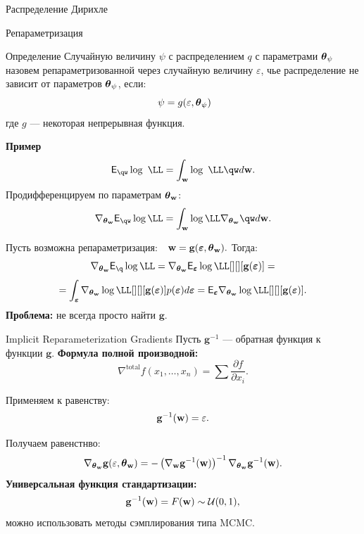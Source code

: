 \documentclass[10pt,pdf,utf8,russian,aspectratio=169]{beamer}
\begin{document}
\begin{frame}{Распределение Дирихле}
\begin{figure}
\end{figure}

\end{frame}




\begin{frame}{Репараметризация}
\footnotesize
\begin{block}{Определение} Случайную величину  $\psi$ с распределением $q$ с параметрами $\boldsymbol{\theta}_\psi$ назовем репараметризованной через случайную величину $\varepsilon$, чье распределение не зависит от параметров $\boldsymbol{\theta}_\psi$, если:
\[
   \psi = g(\varepsilon, \teta_\psi)
\]
где  $g$ --- некоторая непрерывная функция.
\end{block}

\textbf{Пример}
\[
    \E_{\qw} \log~\LL=  \int_{\w} \log~\LL \qw d\w.
\]
Продифференцируем по параметрам $\boldsymbol{\theta}_\mathbf{w}$:
\[
 \nabla_{\tetaw} \E_{\qw} \log \LL = 
\int_{\w}  \log \LL \nabla_{\tetaw}\qw d\w.
\]

Пусть возможна репараметризация:
$
    \w = \mathbf{g}(\boldsymbol{\varepsilon}, \tetaw).
$ 
Тогда:
\[
 \nabla_{\tetaw} \E_{\q} \log \LL = \nabla_{\tetaw} \E_{\boldsymbol{\varepsilon}} \log \LL [][][\mathbf{g}(\boldsymbol{\varepsilon})] =
\]
\[= \int_{\boldsymbol{\varepsilon}}\nabla_{\tetaw} \log\LL [][][\mathbf{g}(\boldsymbol{\varepsilon})] p(\boldsymbol{\varepsilon}) d\boldsymbol{\varepsilon}=\E_{\boldsymbol{\varepsilon}} \nabla_{\tetaw} \log\LL [][][\mathbf{g}(\boldsymbol{\varepsilon})].\]
\textbf{Проблема:} не всегда просто найти $\mathbf{g}$.
\end{frame}


\begin{frame}{Implicit Reparameterization Gradients}
Пусть $\mathbf{g}^{-1}$ --- обратная функция к функции $\mathbf{g}$.
\textbf{Формула полной производной:}
\[
    \nabla^{\text{total}} f(x_1,\dots,x_n) = \sum \frac{\partial{f}}{\partial{x_i}}.
\]

Применяем к равенству:
\[
    \mathbf{g}^{-1}(\mathbf{w}) = \varepsilon.
\]

Получаем равенстнво:
\[
    \nabla_{\boldsymbol{\theta}_\mathbf{w}} \mathbf{g}(\varepsilon, \boldsymbol{\theta}_\mathbf{w}) = -\left(\nabla_{\mathbf{w}} \mathbf{g}^{-1}(\mathbf{w}) \right)^{-1} \nabla_{\boldsymbol{\theta}_\mathbf{w}} \mathbf{g}^{-1}(\mathbf{w}).
\]
\textbf{Универсальная функция стандартизации:}
\[
    \mathbf{g}^{-1}(\mathbf{w}) = F(\mathbf{w}) \sim \mathcal{U}(0,1),
\]
можно использовать методы сэмплирования типа MCMC.
\end{frame}
\end{document}
